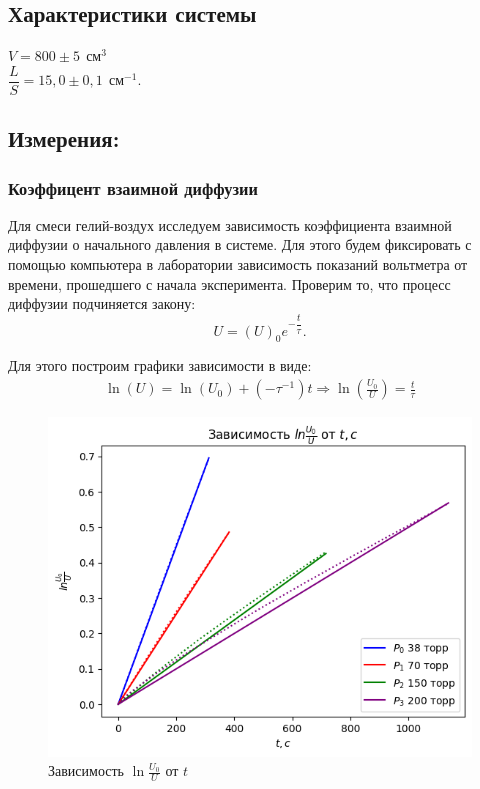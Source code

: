 \documentclass[
a4paper, %
12pt, %
]{article}
\begin{document}
	\subsection{Характеристики системы}
	
	$V = 800 \pm 5 \:\: \text{см}^3$ \\
	$\dfrac{L}{S} = 15,0\pm 0,1 \:\: \text{см}^{-1}$. 
	
	\newpage
	
	\subsection{Измерения:}
	
	\subsubsection{Коэффицент взаимной диффузии}
	
	Для смеси гелий-воздух исследуем зависимость коэффициента взаимной диффузии о начального давления в системе. Для этого будем фиксировать с помощью компьютера в лаборатории зависимость показаний вольтметра от времени, прошедшего с начала эксперимента. Проверим то, что процесс диффузии подчиняется закону: \[U = (U)_0e^{-\dfrac{t}{\tau}}.\]
	
	Для этого построим графики зависимости в виде:
	\begin{align}
		\ln(U) = \ln(U_0) + (-\tau^{-1})t \Rightarrow \ln\left(\frac{U_0}{U}\right) = \frac{t}{\tau}
	\end{align}
	
	\begin{figure}[h!]
		\centering
		\includegraphics[width=0.8\linewidth]{img/graph.png}
		\caption{Зависимость $ \ln\frac{U_0}{U} $ от $ t $}
		\label{fig:graph}
	\end{figure}
	
\end{document}
